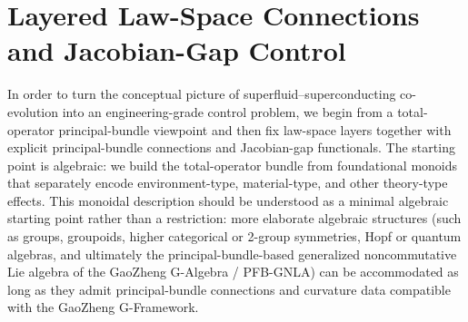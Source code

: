 \documentclass[11pt]{book}
\theoremstyle{plain}
\theoremstyle{definition}
\theoremstyle{remark}
\begin{document}
\section{Layered Law-Space Connections and Jacobian-Gap Control}


In order to turn the conceptual picture of superfluid--superconducting
co-evolution into an engineering-grade control problem, we begin from a
total-operator principal-bundle viewpoint and then fix law-space layers
together with explicit principal-bundle connections and Jacobian-gap
functionals. The starting point is algebraic: we build the total-operator
bundle from foundational monoids that separately encode environment-type,
material-type, and other theory-type effects. This monoidal description
should be understood as a minimal algebraic starting point rather than a
restriction: more elaborate algebraic structures (such as groups,
groupoids, higher categorical or 2-group symmetries, Hopf or quantum
algebras, and ultimately the principal-bundle-based generalized
noncommutative Lie algebra of the GaoZheng G-Algebra / PFB-GNLA) can be
accommodated as long as they admit principal-bundle connections and
curvature data compatible with the GaoZheng G-Framework.
\end{document}
